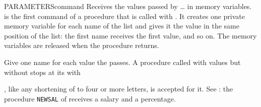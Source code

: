 \begin{XbaseEntry}{PARAMETERS}{command}
Receives the values passed by  \ldots{}  in memory variables.
\Syntax
{}
\Usage
{} is the first command of a procedure that is called with
.  It creates one private memory variable for each name of the list
and gives it the value in the same position of the  list: the first
name receives the first value, and so on.  The memory variables are released
when the procedure returns.

Give  one name for each value the  passes.  A procedure
called with values but without  stops at its  with

, like any shortening of  to four or more
letters, is accepted for it.
\Examples
See : the procedure \texttt{NEWSAL} of  receives a salary
and a percentage.
\end{XbaseEntry}

